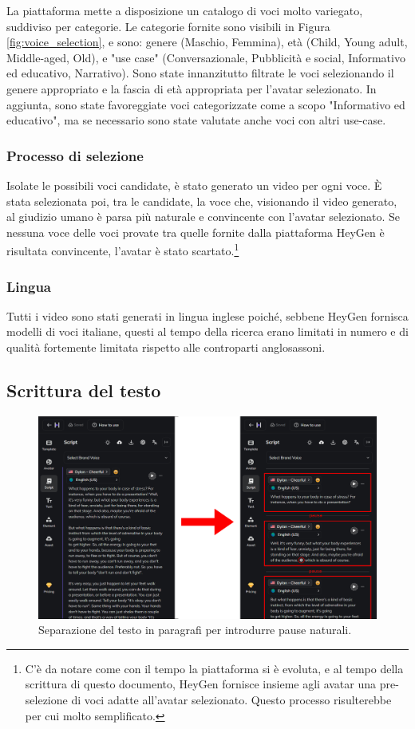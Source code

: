La piattaforma mette a disposizione un catalogo di voci molto variegato, suddiviso per categorie. Le categorie fornite sono visibili in Figura \ref{fig:voice_selection}, e sono: genere (Maschio, Femmina), età (Child, Young adult, Middle-aged, Old), e "use case" (Conversazionale, Pubblicità e social, Informativo ed educativo, Narrativo). Sono state innanzitutto filtrate le voci selezionando il genere appropriato e la fascia di età appropriata per l'avatar selezionato. In aggiunta, sono state favoreggiate voci categorizzate come a scopo "Informativo ed educativo", ma se necessario sono state valutate anche voci con altri use-case.

\subsubsection{Processo di selezione}

Isolate le possibili voci candidate, è stato generato un video per ogni voce. È stata selezionata poi, tra le candidate, la voce che, visionando il video generato, al giudizio umano è parsa più naturale e convincente con l'avatar selezionato. Se nessuna voce delle voci provate tra quelle fornite dalla piattaforma HeyGen è risultata convincente, l'avatar è stato scartato.\footnote{C'è da notare come con il tempo la piattaforma si è evoluta, e al tempo della scrittura di questo documento, HeyGen fornisce insieme agli avatar una pre-selezione di voci adatte all'avatar selezionato. Questo processo risulterebbe per cui molto semplificato.}

\subsubsection{Lingua} Tutti i video sono stati generati in lingua inglese poiché, sebbene HeyGen fornisca modelli di voci italiane, questi al tempo della ricerca erano limitati in numero e di qualità fortemente limitata rispetto alle controparti anglosassoni.

\subsection{Scrittura del testo}

\begin{figure}[t]
    \centering
    \includegraphics[width=0.9\linewidth]{images/text_heygen}
    \caption{Separazione del testo in paragrafi per introdurre pause naturali.}
    \label{fig:text_heygen}
\end{figure}

